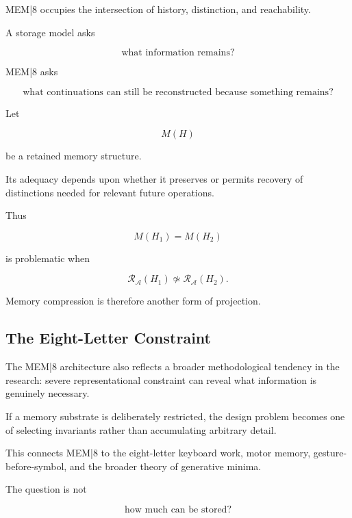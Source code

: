 \documentclass[11pt]{article}
\theoremstyle{remark}
\newcommand{\MEM}{\textsc{MEM|8}}
\newcommand{\Adm}{\mathcal{A}}
\newcommand{\Reach}{\mathcal{R}}
\begin{document}
\MEM{} occupies the intersection of history, distinction, and reachability.

A storage model asks

\begin{equation}
\text{what information remains?}
\end{equation}

\MEM{} asks

\begin{equation}
\text{what continuations can still be reconstructed because something remains?}
\end{equation}

Let

\begin{equation}
M(H)
\end{equation}

be a retained memory structure.

Its adequacy depends upon whether it preserves or permits recovery of distinctions needed for relevant future operations.

Thus

\begin{equation}
M(H_1)=M(H_2)
\end{equation}

is problematic when

\begin{equation}
\Reach_{\Adm}(H_1)
\not\simeq
\Reach_{\Adm}(H_2).
\end{equation}

Memory compression is therefore another form of projection.

\subsection{The Eight-Letter Constraint}

The \MEM{} architecture also reflects a broader methodological tendency in the research: severe representational constraint can reveal what information is genuinely necessary.

If a memory substrate is deliberately restricted, the design problem becomes one of selecting invariants rather than accumulating arbitrary detail.

This connects \MEM{} to the eight-letter keyboard work, motor memory, gesture-before-symbol, and the broader theory of generative minima.

The question is not

\begin{equation}
\text{how much can be stored?}
\end{equation}
\end{document}
